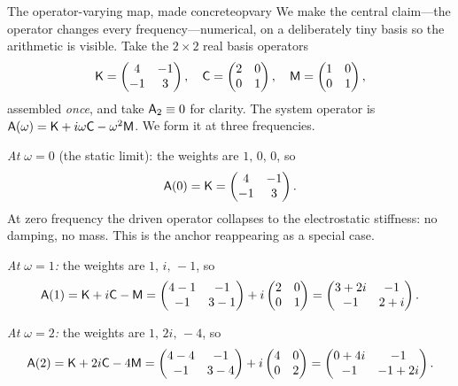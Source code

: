 \begin{workedexample}{The operator-varying map, made concrete}{opvary}
We make the central claim---the operator changes every frequency---numerical, on a
deliberately tiny basis so the arithmetic is visible. Take the $2\times2$ real
basis operators
\[
  \mathsf{K} = \begin{pmatrix} 4 & -1 \\ -1 & 3 \end{pmatrix},\quad
  \mathsf{C} = \begin{pmatrix} 2 & 0 \\ 0 & 1 \end{pmatrix},\quad
  \mathsf{M} = \begin{pmatrix} 1 & 0 \\ 0 & 1 \end{pmatrix},
\]
assembled \emph{once}, and take $\mathsf{A}_2 \equiv 0$ for clarity. The system
operator is $\mathsf{A}(\omega) = \mathsf{K} + i\omega\mathsf{C} - \omega^2\mathsf{M}$. We form it at
three frequencies.

\medskip
\emph{At $\omega = 0$} (the static limit): the weights are $1,\,0,\,0$, so
\[
  \mathsf{A}(0) = \mathsf{K} = \begin{pmatrix} 4 & -1 \\ -1 & 3 \end{pmatrix}.
\]
At zero frequency the driven operator collapses to the electrostatic stiffness:
no damping, no mass. This is the anchor reappearing as a special case.

\medskip
\emph{At $\omega = 1$:} the weights are $1,\,i,\,-1$, so
\[
  \mathsf{A}(1)
    = \mathsf{K} + i\mathsf{C} - \mathsf{M}
    = \begin{pmatrix} 4-1 & -1 \\ -1 & 3-1 \end{pmatrix}
      + i\begin{pmatrix} 2 & 0 \\ 0 & 1 \end{pmatrix}
    = \begin{pmatrix} 3+2i & -1 \\ -1 & 2+i \end{pmatrix}.
\]

\emph{At $\omega = 2$:} the weights are $1,\,2i,\,-4$, so
\[
  \mathsf{A}(2)
    = \mathsf{K} + 2i\mathsf{C} - 4\mathsf{M}
    = \begin{pmatrix} 4-4 & -1 \\ -1 & 3-4 \end{pmatrix}
      + i\begin{pmatrix} 4 & 0 \\ 0 & 2 \end{pmatrix}
    = \begin{pmatrix} 0+4i & -1 \\ -1 & -1+2i \end{pmatrix}.
\]


\end{workedexample}
